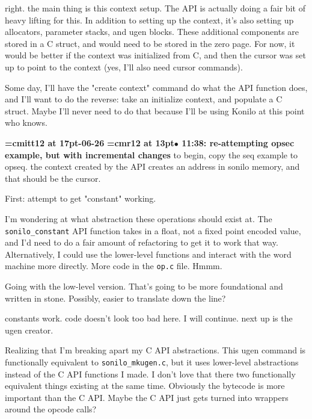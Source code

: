 right. the main thing is this context setup. The API is actually doing a fair bit of heavy lifting for this. In addition to setting up the context, it's also setting up allocators, parameter stacks, and ugen blocks. These additional components are stored in a C struct, and would need to be stored in the zero page. For now, it would be better if the context was initialized from C, and then the cursor was set up to point to the context (yes, I'll also need cursor commands).
\par

Some day, I'll have the "create context" command do what the API function does, and I'll want to do the reverse: take an initialize context, and populate a C struct. Maybe I'll never need to do that because I'll be using Konilo at this point who knows.
\par

{\medskip\noindent\bf\font\titlefont=cmitt12 at 17pt-06-26}\medskip
{\smallskip\noindent\bf\font\titlefont=cmr12 at 13pt\titlefont $\bullet$ 11:38: re-attempting opsec example, but with incremental changes}\smallskip
to begin, copy the seq example to opseq. the context created by the API creates an address in sonilo memory, and that should be the cursor.
\par

First: attempt to get "constant" working.
\par

I'm wondering at what abstraction these operations should exist at. The {\tt sonilo\_constant} API function takes in a float, not a fixed point encoded value, and I'd need to do a fair amount of refactoring to get it to work that way. Alternatively, I could use the lower-level functions and interact with the word machine more directly. More code in the {\tt op.c} file. Hmmm.
\par

Going with the low-level version. That's going to be more foundational and written in stone. Possibly, easier to translate down the line?
\par

constants work. code doesn't look too bad here. I will continue. next up is the ugen creator.
\par

Realizing that I'm breaking apart my C API abstractions. This ugen command is functionally equivalent to {\tt sonilo\_mkugen.c}, but it uses lower-level abstractions instead of the C API functions I made. I don't love that there two functionally equivalent things existing at the same time. Obviously the bytecode is more important than the C API. Maybe the C API just gets turned into wrappers around the opcode calls?
\par

